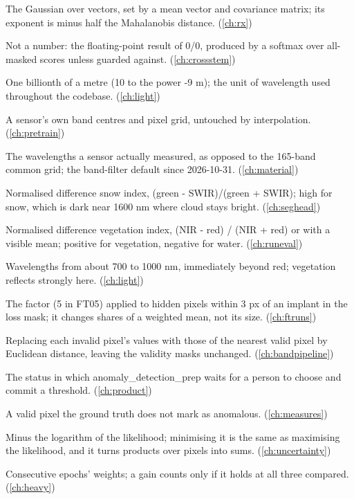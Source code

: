\begin{description}[style=nextline,leftmargin=1.2em,font=\normalfont\bfseries]
\item[Multivariate Gaussian] The Gaussian over vectors, set by a mean vector and covariance matrix; its exponent is minus half the Mahalanobis distance. (\cref{ch:rx})
\item[NaN] Not a number: the floating-point result of 0/0, produced by a softmax over all-masked scores unless guarded against. (\cref{ch:crossstem})
\item[Nanometre] One billionth of a metre (10 to the power -9 m); the unit of wavelength used throughout the codebase. (\cref{ch:light})
\item[Native band list] A sensor's own band centres and pixel grid, untouched by interpolation. (\cref{ch:pretrain})
\item[Native bands] The wavelengths a sensor actually measured, as opposed to the 165-band common grid; the band-filter default since 2026-10-31. (\cref{ch:material})
\item[NDSI] Normalised difference snow index, (green - SWIR)/(green + SWIR); high for snow, which is dark near 1600 nm where cloud stays bright. (\cref{ch:seghead})
\item[NDVI] Normalised difference vegetation index, (NIR - red) / (NIR + red) or with a visible mean; positive for vegetation, negative for water. (\cref{ch:runeval})
\item[Near infrared (NIR)] Wavelengths from about 700 to 1000 nm, immediately beyond red; vegetation reflects strongly here. (\cref{ch:light})
\item[Near weight] The factor (5 in FT05) applied to hidden pixels within 3 px of an implant in the loss mask; it changes shares of a weighted mean, not its size. (\cref{ch:ftruns})
\item[Nearest-valid fill] Replacing each invalid pixel's values with those of the nearest valid pixel by Euclidean distance, leaving the validity masks unchanged. (\cref{ch:bandpipeline})
\item[needs\_threshold] The status in which anomaly\_detection\_prep waits for a person to choose and commit a threshold. (\cref{ch:product})
\item[Negative (background)] A valid pixel the ground truth does not mark as anomalous. (\cref{ch:measures})
\item[Negative log-likelihood] Minus the logarithm of the likelihood; minimising it is the same as maximising the likelihood, and it turns products over pixels into sums. (\cref{ch:uncertainty})
\item[Neighbouring checkpoints] Consecutive epochs' weights; a gain counts only if it holds at all three compared. (\cref{ch:heavy})

\end{description}
